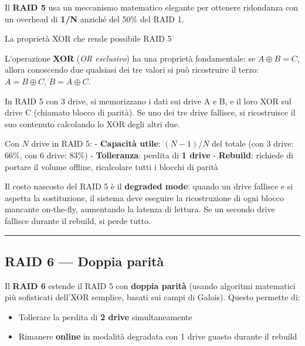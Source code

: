 \documentclass[
  italian,
  openany]{book}
\providecommand{\tightlist}{%
  \setlength{\itemsep}{0pt}\setlength{\parskip}{0pt}}
\begin{document}
Il \textbf{RAID 5} usa un meccanismo matematico elegante per ottenere
ridondanza con un overhead di \textbf{1/N} anziché del 50\% del RAID 1.

\begin{callouttheorem}{La proprietà XOR che rende possibile RAID 5}

L'operazione \textbf{XOR} (\emph{OR esclusivo}) ha una proprietà
fondamentale: se \(A \oplus B = C\), allora conoscendo due qualsiasi dei
tre valori si può ricostruire il terzo: \(A = B \oplus C\),
\(B = A \oplus C\).

In RAID 5 con 3 drive, si memorizzano i dati sui drive A e B, e il loro
XOR sul drive C (chiamato blocco di parità). Se uno dei tre drive
fallisce, si ricostruisce il suo contenuto calcolando lo XOR degli altri
due.

\end{callouttheorem}

Con \(N\) drive in RAID 5: - \textbf{Capacità utile}: \((N-1)/N\) del
totale (con 3 drive: 66\%, con 6 drive: 83\%) - \textbf{Tolleranza}:
perdita di \textbf{1 drive} - \textbf{Rebuild}: richiede di portare il
volume offline, ricalcolare tutti i blocchi di parità

Il costo nascosto del RAID 5 è il \textbf{degraded mode}: quando un
drive fallisce e si aspetta la sostituzione, il sistema deve eseguire la
ricostruzione di ogni blocco mancante on-the-fly, aumentando la latenza
di lettura. Se un secondo drive fallisce durante il rebuild, si perde
tutto.

\begin{center}\rule{0.5\linewidth}{0.5pt}\end{center}

\subsection{RAID 6 --- Doppia parità}\label{raid-6-doppia-parituxe0}

Il \textbf{RAID 6} estende il RAID 5 con \textbf{doppia parità} (usando
algoritmi matematici più sofisticati dell'XOR semplice, basati sui campi
di Galois). Questo permette di:

\begin{itemize}
\tightlist
\item
  Tollerare la perdita di \textbf{2 drive} simultaneamente
\item
  Rimanere \textbf{online} in modalità degradata con 1 drive guasto
  durante il rebuild
\end{itemize}
\end{document}
